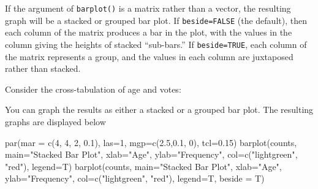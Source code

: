\documentclass[
]{book}
\newenvironment{Shaded}{\begin{snugshade}}{\end{snugshade}}
\newcommand{\AttributeTok}[1]{\textcolor[rgb]{0.77,0.63,0.00}{#1}}
\newcommand{\CommentTok}[1]{\textcolor[rgb]{0.56,0.35,0.01}{\textit{#1}}}
\newcommand{\DecValTok}[1]{\textcolor[rgb]{0.00,0.00,0.81}{#1}}
\newcommand{\FloatTok}[1]{\textcolor[rgb]{0.00,0.00,0.81}{#1}}
\newcommand{\FunctionTok}[1]{\textcolor[rgb]{0.00,0.00,0.00}{#1}}
\newcommand{\NormalTok}[1]{#1}
\newcommand{\OtherTok}[1]{\textcolor[rgb]{0.56,0.35,0.01}{#1}}
\newcommand{\SpecialCharTok}[1]{\textcolor[rgb]{0.00,0.00,0.00}{#1}}
\newcommand{\StringTok}[1]{\textcolor[rgb]{0.31,0.60,0.02}{#1}}
\begin{document}
If the argument of \texttt{barplot()} is a matrix rather than a vector, the resulting graph will be a stacked or grouped bar plot. If \texttt{beside=FALSE} (the default), then each column of the matrix produces a bar in the plot, with the values in the column giving the heights of stacked ``sub-bars.'' If \texttt{beside=TRUE}, each column of the matrix represents a group, and the values in each column are juxtaposed rather than stacked.

Consider the cross-tabulation of age and votes:

\begin{Shaded}
\end{Shaded}

You can graph the results as either a stacked or a grouped bar plot. The resulting graphs are displayed below

\begin{Shaded}
\begin{Highlighting}[]
\FunctionTok{par}\NormalTok{(}\AttributeTok{mar =} \FunctionTok{c}\NormalTok{(}\DecValTok{4}\NormalTok{, }\DecValTok{4}\NormalTok{, }\DecValTok{2}\NormalTok{, }\FloatTok{0.1}\NormalTok{), }\AttributeTok{las=}\DecValTok{1}\NormalTok{, }\AttributeTok{mgp=}\FunctionTok{c}\NormalTok{(}\FloatTok{2.5}\NormalTok{,}\FloatTok{0.1}\NormalTok{, }\DecValTok{0}\NormalTok{), }\AttributeTok{tcl=}\FloatTok{0.15}\NormalTok{)}
\FunctionTok{barplot}\NormalTok{(counts, }
        \AttributeTok{main=}\StringTok{"Stacked Bar Plot"}\NormalTok{, }
        \AttributeTok{xlab=}\StringTok{"Age"}\NormalTok{, }\AttributeTok{ylab=}\StringTok{"Frequency"}\NormalTok{,}
        \AttributeTok{col=}\FunctionTok{c}\NormalTok{(}\StringTok{"lightgreen"}\NormalTok{, }\StringTok{"red"}\NormalTok{),}
        \AttributeTok{legend=}\NormalTok{T)}
\FunctionTok{barplot}\NormalTok{(counts, }
        \AttributeTok{main=}\StringTok{"Stacked Bar Plot"}\NormalTok{, }
        \AttributeTok{xlab=}\StringTok{"Age"}\NormalTok{, }\AttributeTok{ylab=}\StringTok{"Frequency"}\NormalTok{,}
        \AttributeTok{col=}\FunctionTok{c}\NormalTok{(}\StringTok{"lightgreen"}\NormalTok{, }\StringTok{"red"}\NormalTok{),}
        \AttributeTok{legend=}\NormalTok{T, }\AttributeTok{beside =}\NormalTok{ T)}
\end{Highlighting}
\end{Shaded}
\end{document}
